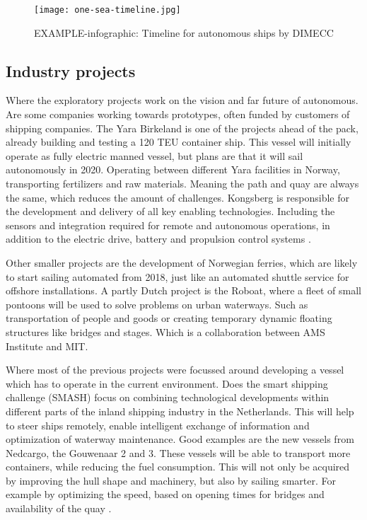 \begin{figure}[hbp]
	\centering
	\texttt{[image: one-sea-timeline.jpg]}
	\caption{EXAMPLE-infographic: Timeline for autonomous ships by DIMECC}
	\label{fig:time-line-autonomous}
\end{figure}

\subsection{Industry projects}
Where the exploratory projects work on the vision and far future of autonomous. Are some companies working towards prototypes, often funded by customers of shipping companies.
The Yara Birkeland is one of the projects ahead of the pack, already building and testing a 120 \ac{TEU} container ship. This vessel will initially operate as fully electric manned vessel, but plans are that it will sail autonomously in 2020. Operating between different Yara facilities in Norway, transporting fertilizers and raw materials. Meaning the path and quay are always the same, which reduces the amount of challenges.
Kongsberg is responsible for the development and delivery of all key enabling technologies. Including the sensors and integration required for remote and autonomous operations, in addition to the electric drive, battery and propulsion control systems \cite{Sames2017}.

Other smaller projects are the development of Norwegian ferries, which are likely to start sailing automated from 2018, just like an automated shuttle service for offshore installations. A partly Dutch project is the Roboat, where a fleet of small pontoons will be used to solve problems on urban waterways. Such as transportation of people and goods or creating temporary dynamic floating structures like bridges and stages. Which is a collaboration between AMS Institute and MIT.

Where most of the previous projects were focussed around developing a vessel which has to operate in the current environment. Does the smart shipping challenge (SMASH) focus on combining technological developments within different parts of the inland shipping industry in the Netherlands. This will help to steer ships remotely, enable intelligent exchange of information and optimization of waterway maintenance.
Good examples are the new vessels from Nedcargo, the Gouwenaar 2 and 3. These vessels will be able to transport more containers, while reducing the fuel consumption. This will not only be acquired by improving the hull shape and machinery, but also by sailing smarter. For example by optimizing the speed, based on opening times for bridges and availability of the quay \cite{SMASH2017}. 

